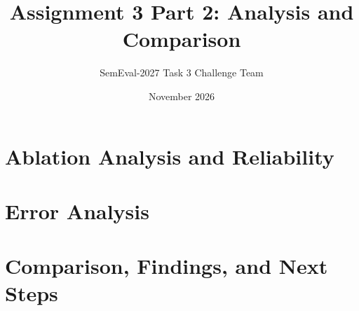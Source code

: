 \documentclass[11pt,a4paper]{article}
\title{Assignment 3 Part 2: Analysis and Comparison}
\author{SemEval-2027 Task 3 Challenge Team}
\date{November 2026}
\begin{document}
\maketitle
\setcounter{section}{2}
\section{Ablation Analysis and Reliability}

\section{Error Analysis}

\section{Comparison, Findings, and Next Steps}

\nocite{cormack2009reciprocal,wang2024multilingual,conneau2019unsupervised,schlechtweg2020semeval}


\end{document}
